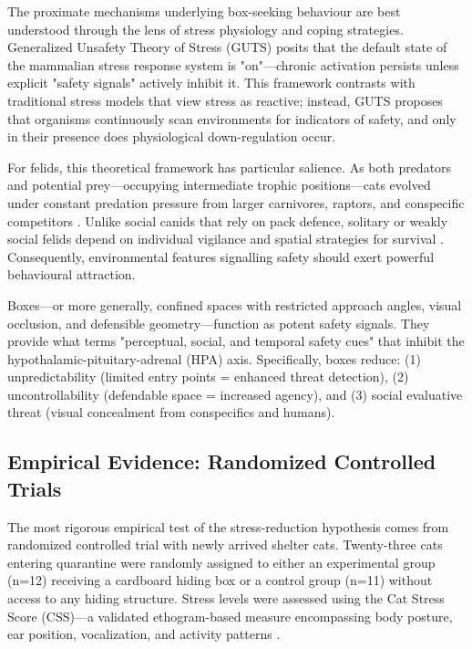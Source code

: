\documentclass[12pt,a4paper]{article}
\begin{document}
The proximate mechanisms underlying box-seeking behaviour are best understood through the lens of stress physiology and coping strategies. \citet{brosschot2017} Generalized Unsafety Theory of Stress (GUTS) posits that the default state of the mammalian stress response system is "on"—chronic activation persists unless explicit "safety signals" actively inhibit it. This framework contrasts with traditional stress models that view stress as reactive; instead, GUTS proposes that organisms continuously scan environments for indicators of safety, and only in their presence does physiological down-regulation occur.

For felids, this theoretical framework has particular salience. As both predators and potential prey—occupying intermediate trophic positions—cats evolved under constant predation pressure from larger carnivores, raptors, and conspecific competitors \citep{kruuk1986}. Unlike social canids that rely on pack defence, solitary or weakly social felids depend on individual vigilance and spatial strategies for survival \citep{macdonald2010}. Consequently, environmental features signalling safety should exert powerful behavioural attraction.

Boxes—or more generally, confined spaces with restricted approach angles, visual occlusion, and defensible geometry—function as potent safety signals. They provide what \citet{brosschot2017} terms "perceptual, social, and temporal safety cues" that inhibit the hypothalamic-pituitary-adrenal (HPA) axis. Specifically, boxes reduce: (1) unpredictability (limited entry points = enhanced threat detection), (2) uncontrollability (defendable space = increased agency), and (3) social evaluative threat (visual concealment from conspecifics and humans).

\subsection{Empirical Evidence: Randomized Controlled Trials}

The most rigorous empirical test of the stress-reduction hypothesis comes from \citet{vinke2014} randomized controlled trial with newly arrived shelter cats. Twenty-three cats entering quarantine were randomly assigned to either an experimental group (n=12) receiving a cardboard hiding box or a control group (n=11) without access to any hiding structure. Stress levels were assessed using the Cat Stress Score (CSS)—a validated ethogram-based measure encompassing body posture, ear position, vocalization, and activity patterns \citep{kessler1997}.
\end{document}
